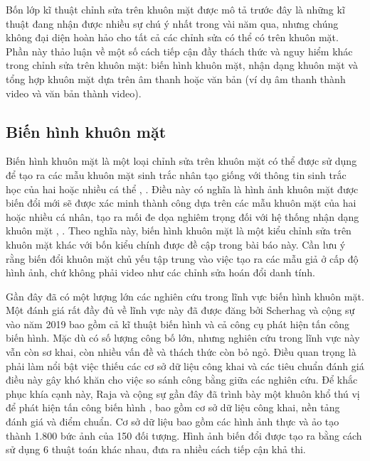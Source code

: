 \documentclass{article}
\begin{document}
Bốn lớp kĩ thuật chỉnh sửa trên khuôn mặt được mô tả trước đây là những kĩ thuật đang nhận được nhiều sự chú ý nhất trong vài năm qua, nhưng chúng không đại diện hoàn hảo cho tất cả các chỉnh sửa có thể có trên khuôn mặt. Phần này thảo luận về một số cách tiếp cận đầy thách thức và nguy hiểm khác trong chỉnh sửa trên khuôn mặt: biến hình khuôn mặt, nhận dạng khuôn mặt và tổng hợp khuôn mặt dựa trên âm thanh hoặc văn bản (ví dụ âm thanh thành video và văn bản thành video).

\subsection{Biến hình khuôn mặt} \label{sec:7-a-face-mophism}

Biến hình khuôn mặt là một loại chỉnh sửa trên khuôn mặt có thể được sử dụng để tạo ra các mẫu khuôn mặt sinh trắc nhân tạo giống với thông tin sinh trắc học của hai hoặc nhiều cá thể , . Điều này có nghĩa là hình ảnh khuôn mặt được biến đổi mới sẽ được xác minh thành công dựa trên các mẫu khuôn mặt của hai hoặc nhiều cá nhân, tạo ra mối đe dọa nghiêm trọng đối với hệ thống nhận dạng khuôn mặt , . Theo nghĩa này, biến hình khuôn mặt là một kiểu chỉnh sửa trên khuôn mặt khác với bốn kiểu chính được đề cập trong bài báo này. Cần lưu ý rằng biến đổi khuôn mặt chủ yếu tập trung vào việc tạo ra các mẫu giả ở cấp độ hình ảnh, chứ không phải video như các chỉnh sửa hoán đổi danh tính.

Gần đây đã có một lượng lớn các nghiên cứu trong lĩnh vực biến hình khuôn mặt. Một đánh giá rất đầy đủ về lĩnh vực này đã được đăng bởi Scherhag và cộng sự  vào năm 2019 bao gồm cả kĩ thuật biến hình và cả công cụ phát hiện tấn công biến hình. Mặc dù có số lượng công bố lớn, nhưng nghiên cứu trong lĩnh vực này vẫn còn sơ khai, còn nhiều vấn đề và thách thức còn bỏ ngỏ. Điều quan trọng là phải làm nổi bật việc thiếu các cơ sở dữ liệu công khai và các tiêu chuẩn đánh giá điều này gây khó khăn cho việc so sánh công bằng giữa các nghiên cứu. Để khắc phục khía cạnh này, Raja và cộng sự gần đây đã trình bày một khuôn khổ thú vị để phát hiện tấn công biến hình , bao gồm cơ sở dữ liệu công khai, nền tảng đánh giá và điểm chuẩn. Cơ sở dữ liệu bao gồm các hình ảnh thực và ảo tạo thành 1.800 bức ảnh của 150 đối tượng. Hình ảnh biến đổi được tạo ra bằng cách sử dụng 6 thuật toán khác nhau, đưa ra nhiều cách tiếp cận khả thi.
\end{document}
